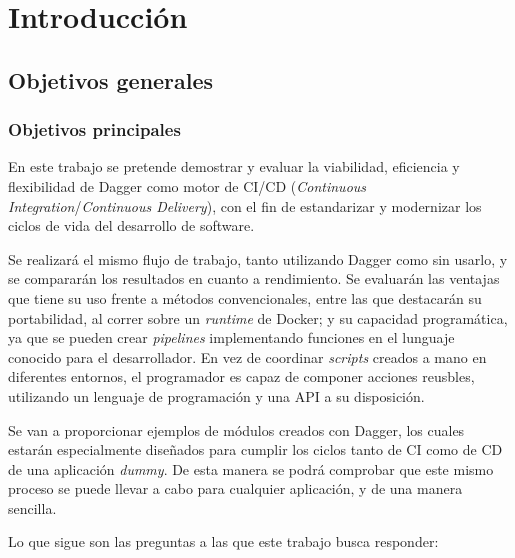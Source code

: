 \chapter{Introducción}


\section{Objetivos generales}


\subsection*{Objetivos principales}

En este trabajo se pretende demostrar y evaluar la viabilidad, eficiencia y flexibilidad de Dagger\cite{dagger} como motor de CI/CD (\textit{Continuous Integration}/\textit{Continuous Delivery})\cite{ci,cd}, con el fin de estandarizar y modernizar los ciclos de vida del desarrollo de software.

Se realizará el mismo flujo de trabajo, tanto utilizando Dagger como sin usarlo, y se compararán los resultados en cuanto a rendimiento. Se evaluarán las ventajas que tiene su uso frente a métodos convencionales, entre las que destacarán su portabilidad, al correr sobre un \textit{runtime} de Docker; y su capacidad programática, ya que se pueden crear \textit{pipelines} implementando funciones en el lunguaje conocido para el desarrollador. En vez de coordinar \textit{scripts} creados a mano en diferentes entornos, el programador es capaz de componer acciones reusbles, utilizando un lenguaje de programación y una API a su disposición.

Se van a proporcionar ejemplos de módulos creados con Dagger, los cuales estarán especialmente diseñados para cumplir los ciclos tanto de CI como de CD de una aplicación \textit{dummy}. De esta manera se podrá comprobar que este mismo proceso se puede llevar a cabo para cualquier aplicación, y de una manera sencilla.

Lo que sigue son las preguntas a las que este trabajo busca responder:

